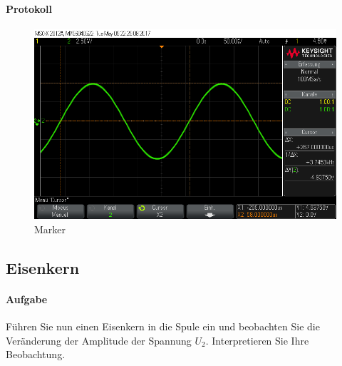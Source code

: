 \documentclass[10pt]{scrreprt}
\begin{document}
        \paragraph{Protokoll}
        \begin{center}
            \begin{figure}[H]
                \includegraphics[width=\textwidth]{scope_24.png}
                \caption{Marker}
            \end{figure}
        \end{center}


        \subsection{Eisenkern}
        \paragraph{Aufgabe}
        Führen Sie nun einen Eisenkern in die Spule ein und beobachten Sie die Veränderung
        der Amplitude der Spannung $U_2$. Interpretieren Sie Ihre Beobachtung.
\end{document}

